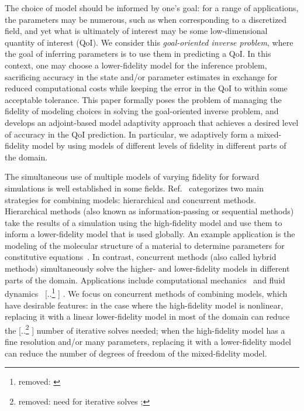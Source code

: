 \documentclass[review]{siamart0516}
\providecommand{\DIFaddtex}[1]{{\protect\color{blue} \sf #1}} %
\providecommand{\DIFdeltex}[1]{{\protect\color{red} [..\footnote{removed: #1} ]}} %
\providecommand{\DIFaddbegin}{} %
\providecommand{\DIFaddend}{} %
\providecommand{\DIFdelbegin}{} %
\providecommand{\DIFdelend}{} %
\providecommand{\DIFadd}[1]{\texorpdfstring{\DIFaddtex{#1}}{#1}} %
\providecommand{\DIFdel}[1]{\texorpdfstring{\DIFdeltex{#1}}{}} %
\newcommand{\DIFscaledelfig}{0.5}
\newlength{\DIFdelgraphicswidth} %
\newlength{\DIFdelgraphicsheight} %
\newcommand{\DIFaddincludegraphics}[2][]{{\color{blue}\fbox{\DIFOincludegraphics[#1]{#2}}}} %
\newcommand{\DIFdelincludegraphics}[2][]{%
\sbox{\DIFdelgraphicsbox}{\DIFOincludegraphics[#1]{#2}}%
\settoboxwidth{\DIFdelgraphicswidth}{\DIFdelgraphicsbox} %
\settoboxtotalheight{\DIFdelgraphicsheight}{\DIFdelgraphicsbox} %
\scalebox{\DIFscaledelfig}{%
\parbox[b]{\DIFdelgraphicswidth}{\usebox{\DIFdelgraphicsbox}\\[-\baselineskip] \rule{\DIFdelgraphicswidth}{0em}}\llap{\resizebox{\DIFdelgraphicswidth}{\DIFdelgraphicsheight}{%
\setlength{\unitlength}{\DIFdelgraphicswidth}%
\begin{picture}(1,1)%
\thicklines\linethickness{2pt} %
{\color[rgb]{1,0,0}\put(0,0){\framebox(1,1){}}}%
{\color[rgb]{1,0,0}\put(0,0){\line( 1,1){1}}}%
{\color[rgb]{1,0,0}\put(0,1){\line(1,-1){1}}}%
\end{picture}%
}\hspace*{3pt}}} %
} %
\DeclareRobustCommand{\DIFaddbegin}{\DIFOaddbegin \let\includegraphics\DIFaddincludegraphics} %
\DeclareRobustCommand{\DIFaddend}{\DIFOaddend \let\includegraphics\DIFOincludegraphics} %
\DeclareRobustCommand{\DIFdelbegin}{\DIFOdelbegin \let\includegraphics\DIFdelincludegraphics} %
\DeclareRobustCommand{\DIFdelend}{\DIFOaddend \let\includegraphics\DIFOincludegraphics} %
\begin{document}
The choice of model should be informed by one's goal: for a range of applications, the parameters may be numerous, such as when corresponding to a discretized field, and yet what is ultimately of interest may be some low-dimensional quantity of interest (QoI). We consider this \textit{goal-oriented inverse problem}, where the goal of inferring parameters is to use them in predicting a QoI. In this context, one may choose a lower-fidelity model for the inference problem, sacrificing accuracy in the state and/or parameter estimates in exchange for reduced computational costs while keeping the error in the QoI to within some acceptable tolerance.  This paper formally poses the problem of managing the fidelity of modeling choices in solving the goal-oriented inverse problem, and develops an adjoint-based model adaptivity approach that achieves a desired level of accuracy in the QoI prediction. In particular, we adaptively form a mixed-fidelity model by using models of different levels of fidelity in different parts of the domain.

The simultaneous use of multiple models of varying fidelity for forward simulations is well established in some fields. Ref.~\cite{Liuetal03} categorizes two main strategies for combining models: hierarchical and concurrent methods. Hierarchical methods (also known as information-passing or sequential methods) take the results of a simulation using the high-fidelity model and use them to inform a lower-fidelity model that is used globally. An example application is the modeling of the molecular structure of a material to determine parameters for constitutive equations~\cite{Haoetal03,Weietal04}. In contrast, concurrent methods \DIFaddbegin \DIFadd{(also called hybrid methods) }\DIFaddend simultaneously solve the higher- and lower-fidelity models in different parts of the domain. Applications include computational mechanics~\cite{Khareetal08,Prudetal08} and fluid dynamics~\DIFdelbegin \DIFdel{\cite{vanOpstaletal15,LucKinBer02,FatGerQua01}}\DIFdelend \DIFaddbegin \DIFadd{\cite{AlexGarTar02,FatGerQua01,Garcetal99,LucKinBer02,vanOpstaletal15,WadErw90}}\DIFaddend .
We focus on concurrent methods of combining models, which have desirable features: in the case where the high-fidelity model is nonlinear, replacing it with a linear lower-fidelity model in most of the domain can reduce the \DIFdelbegin \DIFdel{need for iterative solves ;
}\DIFdelend \DIFaddbegin \DIFadd{number of iterative solves needed; }\DIFaddend when the high-fidelity model has a fine resolution and/or many parameters, replacing it with a lower-fidelity model can reduce the number of degrees of freedom of the mixed-fidelity model.
\end{document}
